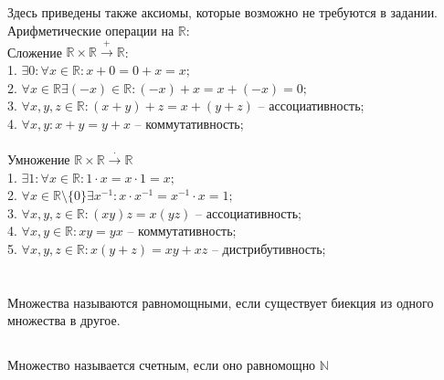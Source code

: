 \subsection{}
	Здесь приведены также аксиомы, которые возможно не требуются в задании.
	Арифметические операции на $\mathbb{R}$:\\
	Сложение $\mathbb{R}\times\mathbb{R}\xrightarrow{+}\mathbb{R}$:\\
	1. $\exists 0: \forall x\in\mathbb{R}:x+0=0+x=x;$\\
	2. $\forall x\in\mathbb{R} \exists (-x)\in\mathbb{R}:(-x)+x=x+(-x)=0;$\\
	3. $\forall x, y, z\in \mathbb{R}: (x + y) + z = x + (y + z)$ -- ассоциативность;\\
	4. $\forall x, y: x + y = y + x$ -- коммутативность;\\\\
	Умножение $\mathbb{R}\times\mathbb{R}\xrightarrow{\cdot}\mathbb{R}$\\
	1. $\exists 1: \forall x\in\mathbb{R}: 1\cdot x=x\cdot 1 = x;$\\
	2. $\forall x\in\mathbb{R}\setminus\{0\}\exists x^{-1}: x\cdot x^{-1} = x^{-1}\cdot x = 1;$\\
	3. $\forall x, y, z\in\mathbb{R}:(xy)z=x(yz)$ -- ассоциативность;\\
	4. $\forall x, y\in\mathbb{R}: xy=yx$ -- коммутативность;\\
	5. $\forall x, y, z\in\mathbb{R}: x(y+z) = xy+xz$ -- дистрибутивность;\\
\section{}
\subsection{}
Множества называются равномощными, если существует биекция из одного множества в другое.
\subsection{}
Множество называется счетным, если оно равномощно $\mathbb{N}$
